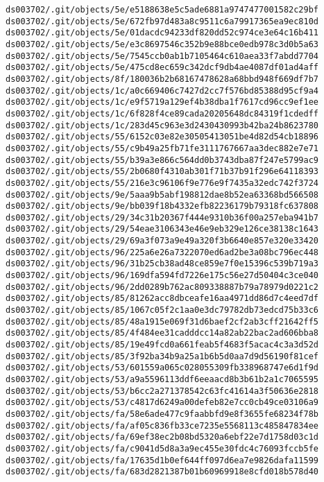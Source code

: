 \documentclass[11pt]{article}
\begin{document}
\begin{Verbatim}[commandchars=\\\{\}]
ds003702/.git/objects/5e/e5188638e5c5ade6881a9747477001582c29bf
ds003702/.git/objects/5e/672fb97d483a8c9511c6a79917365ea9ec810d
ds003702/.git/objects/5e/01dacdc94233df820dd52c974ce3e64c16b411
ds003702/.git/objects/5e/e3c8697546c352b9e88bce0edb978c3d0b5a63
ds003702/.git/objects/5e/7545ccb0ab1b7105464c610aea33f7abdd7704
ds003702/.git/objects/5e/475cd8ec659c342dcf9db4ae4087df01ad4aff
ds003702/.git/objects/8f/180036b2b68167478628a68bbd948f669df7b7
ds003702/.git/objects/1c/a0c669406c7427d2cc7f576bd85388d95cf9a4
ds003702/.git/objects/1c/e9f5719a129ef4b38dba1f7617cd96cc9ef1ee
ds003702/.git/objects/1c/6f828f4ce89cada20205648dc84319f1cdedff
ds003702/.git/objects/1c/283d45c963e3d2430430993b42ba24b8623780
ds003702/.git/objects/55/6152c03e82e30505413051be4d82d54cb18896
ds003702/.git/objects/55/c9b49a25fb71fe3111767667aa3dec882e7e71
ds003702/.git/objects/55/b39a3e866c564dd0b3743dba87f247e5799ac9
ds003702/.git/objects/55/2b0680f4310ab301f71b37b91f296e64118393
ds003702/.git/objects/55/216e3c96106f9e776e9f7435a32edc742f3724
ds003702/.git/objects/9e/5aaa9b5abf198812dae8b52ea63368bd566508
ds003702/.git/objects/9e/bb039f18b4332efb82236179b79318fc637808
ds003702/.git/objects/29/34c31b20367f444e9310b36f00a257eba941b7
ds003702/.git/objects/29/54eae3106343e46e9eb329e126ce38138c1643
ds003702/.git/objects/29/69a3f073a9e49a320f3b6640e857e320e33420
ds003702/.git/objects/96/225a6e26a7322070ed6ad2be3a08bc796ec448
ds003702/.git/objects/96/31b25cb38ad48ce859e7f0e15396c539b719a3
ds003702/.git/objects/96/169dfa594fd7226e175c56e27d50404c3ce040
ds003702/.git/objects/96/2dd0289b762ac809338887b79a78979d0221c2
ds003702/.git/objects/85/81262acc8dbceafe16aa4971dd86d7c4eed7df
ds003702/.git/objects/85/1067c05f2c1aa0e3dc79782db73edcd75b33c6
ds003702/.git/objects/85/48a1915e069f31d6baef2cf2ab3cff21642ff5
ds003702/.git/objects/85/4f484ee31cadddcc14a82ab22bac2ad606bba8
ds003702/.git/objects/85/19e49fcd0a661feab5f4683f5acac4c3a3d52d
ds003702/.git/objects/85/3f92ba34b9a25a1b6b5d0aa7d9d56190f81cef
ds003702/.git/objects/53/601559a065c028055309fb338968747e6d1f9d
ds003702/.git/objects/53/a9a5596113ddf6eeaacd8b3b61b2a1c7065595
ds003702/.git/objects/53/b6cc2a271378542c63fc41614a3f50636e2818
ds003702/.git/objects/53/c4817d6249a00defeb82e7cc0cb49ce03106a9
ds003702/.git/objects/fa/58e6ade477c9faabbfd9e8f3655fe68234f78b
ds003702/.git/objects/fa/af05c836fb33ce7235e5568113c485847834ee
ds003702/.git/objects/fa/69ef38ec2b08bd5320a6ebf22e7d1758d03c1d
ds003702/.git/objects/fa/c9041d5d8a3a9ec455e30fdc4c76093fccb5fe
ds003702/.git/objects/fa/17635d1b0ef644ff097d6ea7e9826dafa11599
ds003702/.git/objects/fa/683d2821387b01b60969918e8cfd018b578d40

\end{Verbatim}
\end{document}
